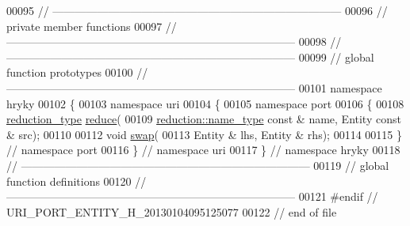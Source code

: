 \begin{DoxyCode}
00095 \textcolor{comment}{//
      ------------------------------------------------------------------------------}
00096 \textcolor{comment}{// private member functions}
00097 \textcolor{comment}{//
      ------------------------------------------------------------------------------}
00098 \textcolor{comment}{//
      ------------------------------------------------------------------------------}
00099 \textcolor{comment}{// global function prototypes}
00100 \textcolor{comment}{//
      ------------------------------------------------------------------------------}
00101 \textcolor{keyword}{namespace }hryky
00102 \{
00103 \textcolor{keyword}{namespace }uri
00104 \{
00105 \textcolor{keyword}{namespace }port
00106 \{
00108     \hyperlink{namespacehryky_a343a9a4c36a586be5c2693156200eadc}{reduction_type} \hyperlink{namespacehryky_1_1uri_ab4530b241565d82fb0768bb29031858f}{reduce}(
00109         \hyperlink{namespacehryky_1_1reduction_ac686c30a4c8d196bbd0f05629a6b921f}{reduction::name_type} \textcolor{keyword}{const} & name, Entity \textcolor{keyword}{const} & src);
00110 
00112     \textcolor{keywordtype}{void} \hyperlink{namespacehryky_1_1uri_a385681623309ce37d502b7efea1bf924}{swap}(
00113         Entity & lhs, Entity & rhs);
00114 
00115 \} \textcolor{comment}{// namespace port}
00116 \} \textcolor{comment}{// namespace uri}
00117 \} \textcolor{comment}{// namespace hryky}
00118 \textcolor{comment}{//
      ------------------------------------------------------------------------------}
00119 \textcolor{comment}{// global function definitions}
00120 \textcolor{comment}{//
      ------------------------------------------------------------------------------}
00121 \textcolor{preprocessor}{#endif // URI\_PORT\_ENTITY\_H\_20130104095125077}
00122 \textcolor{preprocessor}{}\textcolor{comment}{// end of file}
\end{DoxyCode}
